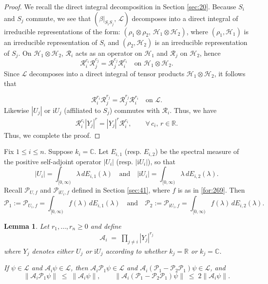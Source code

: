 \documentclass[11 pt]{amsart}
\newcommand{\RR}{\mathbb{R}}
\newcommand{\CC}{\mathbb{C}}
\newtheorem{lemma}[theorem]{Lemma}
\theoremstyle{definition}
\numberwithin{equation}{section}
\begin{document}
\begin{proof}
We recall the direct integral decomposition in Section \ref{sec:20}. Because $S_i$ and $S_j$ commute, we see that
$(\beta|_{S_iS_j},\,\mathcal{L})$ decomposes into a direct integral of irreducible representations of the form: $(\rho_1 \otimes \rho_2, \,\mathcal{H}_1 \otimes \mathcal{H}_2)$, where $(\rho_1, \mathcal{H}_1)$ is an irreducible representation of $S_i$ and $(\rho_2, \mathcal{H}_2)$ is an irreducible representation of $S_j$.  On $\mathcal{H}_1\otimes\mathcal{H}_2$, \(\mathcal{R}_i\) acts as an operator on \(\mathcal{H}_1\) and \(\mathcal{R}_j\) on \(\mathcal{H}_2\), hence
\[
  \mathcal{R}_{i}^{c_i} \mathcal{R}_{j}^{c_j}=\mathcal{R}_{j}^{c_j} \mathcal{R}_{i}^{c_i}\quad\text{on }\mathcal{H}_1\otimes\mathcal{H}_2.
\]
Since $\mathcal{L}$ decomposes into a direct integral of tensor products $\mathcal{H}_1\otimes\mathcal{H}_2$, it follows that

\[
  \mathcal{R}_{i}^{r_i} \mathcal{R}_{j}^{r_j}=\mathcal{R}_{j}^{r_j} \mathcal{R}_{i}^{r_i}\quad\text{on }\mathcal{L}.
\]
Likewise \(|U_j|\) or $\textrm{i}U_j$ (affiliated to \(S_j\)) commutes with \(\mathcal{R}_i\). Thus, we have
\begin{align*}
  \mathcal{R}_{i}^{c_i}|Y_j|^r=|Y_j|^r\mathcal{R}_{i}^{c_i},\qquad \forall\,c_i,\, r\in\RR.
\end{align*}
Thus, we complete the proof.
\end{proof}
Fix $1\leq i\leq n$. Suppose $k_i=\CC$.  Let $E_{i,1}$ (resp. $E_{i,2}$) be the spectral measure of the positive self-adjoint operator $|U_i|$ (resp. $|\textrm{i}U_i|$),
  so that
  \[
    |U_i| = \int_{[0,\infty)} \lambda\,dE_{i,1}(\lambda)\quad\text{and}\quad|\textrm{i}U_i| = \int_{[0,\infty)} \lambda\,dE_{i,2}(\lambda).
  \]
Recall $\mathcal{P}_{U,f}$ and $\mathcal{P}_{\mathrm{i}U_i,f}$ defined in Section \ref{sec:41}, where $f$ is as in \eqref{for:269}. Then
  \[
    \mathcal{P}_1:=\mathcal{P}_{U_i,f} = \int_{[0,\infty)} f(\lambda)\,dE_{i,1}(\lambda)\quad\text{and}\quad \mathcal{P}_2:=\mathcal{P}_{\mathrm{i}U_i,f} = \int_{[0,\infty)} f(\lambda)\,dE_{i,2}(\lambda).
  \]
\begin{lemma}\label{le:20} Let $r_1,\dots,r_n\ge0$ and define
\begin{align*}
  \mathcal A_i \;=\; \prod_{j\ne i}|Y_j|^{r_j}
\end{align*}
where $Y_j$ denotes either $U_j$ or $\mathrm{i}U_j$ according to whether
$k_j=\mathbb R$ or $k_j=\mathbb C$.

If $\psi\in\mathcal L$ and $\mathcal A_i\psi\in\mathcal L$, then
$\mathcal A_i\mathcal{P}_1\psi\in\mathcal L$ and
$\mathcal A_i(\mathcal{P}_1-\mathcal{P}_2\mathcal{P}_1)\psi\in\mathcal L$, and
\[
  \big\|\mathcal A_i\mathcal{P}_1\psi\big\|
    \;\le\; \|\mathcal A_i\psi\|,
  \qquad
  \big\|\mathcal A_i(\mathcal{P}_1-\mathcal{P}_2\mathcal{P}_1)\psi\big\|
    \;\le\; 2\|\mathcal A_i\psi\|.
\]


\end{lemma}
\end{document}
